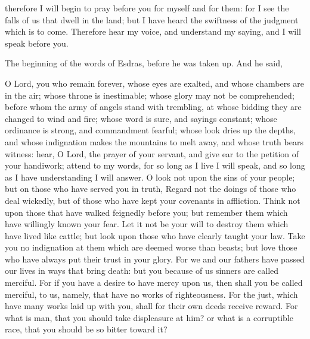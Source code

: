 {therefore I will begin to pray before you for myself and for them: for I see the falls of us that dwell in the land;
but I have heard the swiftness of the judgment which is to come.
Therefore hear my voice, and understand my saying, and I will speak before you.
\par }{\PP The beginning of the words of Esdras, before he was taken up. And he said,
\par }{\PP {}O Lord, you who
 remain forever, whose eyes are exalted, and whose chambers are in the air;
whose throne is inestimable; whose glory may not be comprehended; before whom the army of angels stand with trembling,
 at whose bidding they are changed to wind and fire; whose word is sure, and sayings constant; whose ordinance is strong, and commandment fearful;
whose look dries up the depths, and whose indignation makes the mountains to melt away, and whose truth bears witness:
hear, O Lord, the prayer of your servant, and give ear to the petition of your handiwork;
attend to my words, for so long as I live I will speak, and so long as I have understanding I will answer.
O look not upon the sins of your people; but on those who have served you in truth,
Regard not the doings of those who deal wickedly, but of those who have kept your covenants in affliction.
Think not upon those that have walked feignedly before you; but remember them which have willingly known your fear.
Let it not be your will to destroy them which have lived like cattle; but look upon those who have
 clearly taught your law.
Take you no indignation at them which are deemed worse than beasts; but love those who have always put their trust in your glory.
For we and our fathers have
 passed our lives in
 ways that bring death: but you because of us sinners
 are called merciful.
For if you have a desire to have mercy upon us, then shall you be called merciful, to us, namely, that have no works of righteousness.
For the just, which have many
{} works laid up with you, shall for their own deeds receive reward.
For what is man, that you should take displeasure at him? or what is a corruptible race, that you should be so bitter toward it?
}
